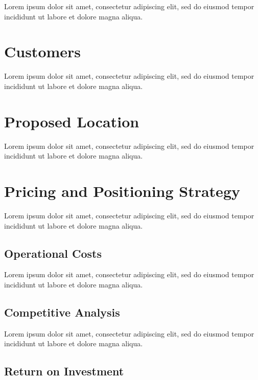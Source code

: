 Lorem ipsum dolor sit amet, consectetur adipiscing elit, sed do eiusmod tempor incididunt ut labore et dolore magna aliqua.


\section{Customers}

Lorem ipsum dolor sit amet, consectetur adipiscing elit, sed do eiusmod tempor incididunt ut labore et dolore magna aliqua.


\section{Proposed Location}

Lorem ipsum dolor sit amet, consectetur adipiscing elit, sed do eiusmod tempor incididunt ut labore et dolore magna aliqua.


\section{Pricing and Positioning Strategy}

Lorem ipsum dolor sit amet, consectetur adipiscing elit, sed do eiusmod tempor incididunt ut labore et dolore magna aliqua.

\subsection{Operational Costs}

Lorem ipsum dolor sit amet, consectetur adipiscing elit, sed do eiusmod tempor incididunt ut labore et dolore magna aliqua.

\subsection{Competitive Analysis}

Lorem ipsum dolor sit amet, consectetur adipiscing elit, sed do eiusmod tempor incididunt ut labore et dolore magna aliqua.

\subsection{Return on Investment}

